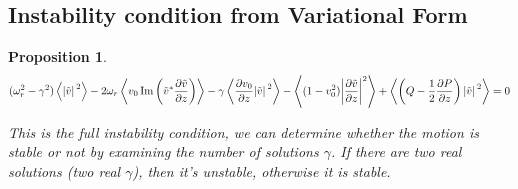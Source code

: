 \documentclass{article}
\theoremstyle{plain}
\newtheorem{proposition}{Proposition}
\theoremstyle{definition}
\theoremstyle{remark}
\theoremstyle{remark}
\begin{document}
\subsection{Instability condition from Variational Form}
\begin{proposition}
    \begin{equation}
        (\omega_r^2-\gamma^2) \expval{\abs*{\tilde{v}}^2} 
        - 2\omega_r\expval{v_0 \Im\left(\tilde{v}^*\pdv{\tilde{v}}{z}\right)} 
        - \gamma\expval{\pdv{v_0}{z}\abs*{\tilde{v}}^2} 
        - \expval{(1-v_0^2)\abs{\pdv{\tilde{v}}{z}}^2 }
        + \expval{\left(Q-\frac{1}{2}\pdv{P}{z}\right)\abs*{\tilde{v}}^2} = 0
        \label{eq:stability-condition}
    \end{equation}

    This is the full instability condition, we can determine whether the motion is stable or not by examining the number of solutions $\gamma$. If there are two real solutions (two real $\gamma$), then it's unstable, otherwise it is stable.
\end{proposition}
\end{document}
